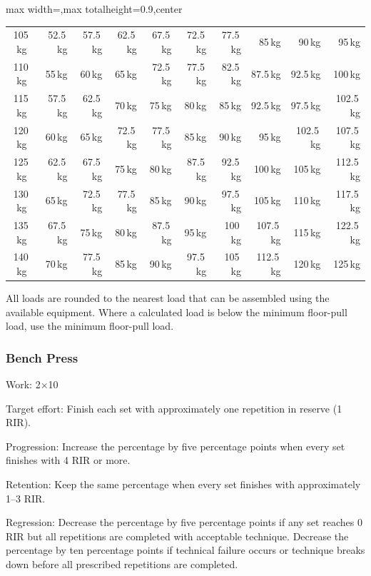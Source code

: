 \documentclass[11pt,a4paper]{article}
\begin{document}
\begin{center}
\begin{adjustbox}{max width=\linewidth,max totalheight=0.9\textheight,center}
\begin{tabular}{crrrrrrrrr}
105\,kg  & 52.5\,kg & 57.5\,kg & 62.5\,kg & 67.5\,kg & 72.5\,kg & 77.5\,kg & 85\,kg & 90\,kg & 95\,kg \\
110\,kg  & 55\,kg & 60\,kg & 65\,kg & 72.5\,kg & 77.5\,kg & 82.5\,kg & 87.5\,kg & 92.5\,kg & 100\,kg \\
115\,kg  & 57.5\,kg & 62.5\,kg & 70\,kg & 75\,kg & 80\,kg & 85\,kg & 92.5\,kg & 97.5\,kg & 102.5\,kg \\
120\,kg  & 60\,kg & 65\,kg & 72.5\,kg & 77.5\,kg & 85\,kg & 90\,kg & 95\,kg & 102.5\,kg & 107.5\,kg \\
125\,kg  & 62.5\,kg & 67.5\,kg & 75\,kg & 80\,kg & 87.5\,kg & 92.5\,kg & 100\,kg & 105\,kg & 112.5\,kg \\
130\,kg  & 65\,kg & 72.5\,kg & 77.5\,kg & 85\,kg & 90\,kg & 97.5\,kg & 105\,kg & 110\,kg & 117.5\,kg \\
135\,kg  & 67.5\,kg & 75\,kg & 80\,kg & 87.5\,kg & 95\,kg & 100\,kg & 107.5\,kg & 115\,kg & 122.5\,kg \\
140\,kg  & 70\,kg & 77.5\,kg & 85\,kg & 90\,kg & 97.5\,kg & 105\,kg & 112.5\,kg & 120\,kg & 125\,kg \\
\bottomrule
\end{tabular}
\end{adjustbox}
\renewcommand{\arraystretch}{1}
\end{center}

All loads are rounded to the nearest load that can be assembled using the available equipment. Where a calculated load is below the minimum floor-pull load, use the minimum floor-pull load.

\newpage
\subsubsection{Bench Press}

Work: 2$\times$10

Target effort: Finish each set with approximately one repetition in reserve (1 RIR).

Progression: Increase the percentage by five percentage points when every set finishes with 4 RIR or more.

Retention: Keep the same percentage when every set finishes with approximately 1--3 RIR.

Regression: Decrease the percentage by five percentage points if any set reaches 0 RIR but all repetitions are completed with acceptable technique. Decrease the percentage by ten percentage points if technical failure occurs or technique breaks down before all prescribed repetitions are completed.
\end{document}
